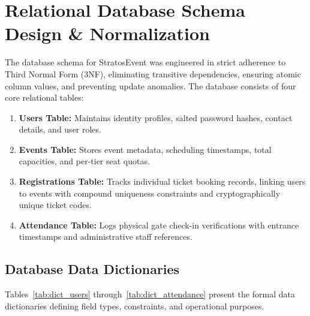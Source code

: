 \documentclass[11pt,a4paper]{report}
\begin{document}
\section{Relational Database Schema Design \& Normalization}
\justifying
The database schema for StratosEvent was engineered in strict adherence to Third Normal Form (3NF), eliminating transitive dependencies, ensuring atomic column values, and preventing update anomalies. The database consists of four core relational tables:
\begin{enumerate}[leftmargin=1.5em, itemsep=0.3em]
    \item \textbf{Users Table:} Maintains identity profiles, salted password hashes, contact details, and user roles.
    \item \textbf{Events Table:} Stores event metadata, scheduling timestamps, total capacities, and per-tier seat quotas.
    \item \textbf{Registrations Table:} Tracks individual ticket booking records, linking users to events with compound uniqueness constraints and cryptographically unique ticket codes.
    \item \textbf{Attendance Table:} Logs physical gate check-in verifications with entrance timestamps and administrative staff references.
\end{enumerate}

\subsection{Database Data Dictionaries}
Tables~\ref{tab:dict_users} through~\ref{tab:dict_attendance} present the formal data dictionaries defining field types, constraints, and operational purposes.
\end{document}
